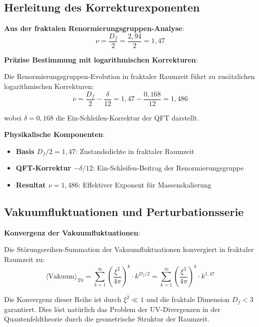 \documentclass[12pt,a4paper]{article}
\newcommand{\nulep}{\nu}
\begin{document}
\subsection{Herleitung des Korrekturexponenten}

\textbf{Aus der fraktalen Renormierungsgruppen-Analyse}:
\begin{equation}
	\nulep = \frac{D_f}{2} = \frac{2{,}94}{2} = 1{,}47
\end{equation}

\textbf{Präzise Bestimmung mit logarithmischen Korrekturen}:

Die Renormierungsgruppen-Evolution in fraktaler Raumzeit führt zu zusätzlichen logarithmischen Korrekturen:
\begin{equation}
	\nulep = \frac{D_f}{2} - \frac{\delta}{12} = 1{,}47 - \frac{0{,}168}{12} = 1{,}486
\end{equation}

wobei $\delta = 0{,}168$ die Ein-Schleifen-Korrektur der QFT darstellt.

\textbf{Physikalische Komponenten}:
\begin{itemize}
	\item \textbf{Basis $D_f/2 = 1{,}47$}: Zustandsdichte in fraktaler Raumzeit
	\item \textbf{QFT-Korrektur $-\delta/12$}: Ein-Schleifen-Beitrag der Renormierungsgruppe
	\item \textbf{Resultat $\nulep = 1{,}486$}: Effektiver Exponent für Massenskalierung
\end{itemize}

\subsection{Vakuumfluktuationen und Perturbationsserie}

\textbf{Konvergenz der Vakuumfluktuationen}:

Die Störungsreihen-Summation der Vakuumfluktuationen konvergiert in fraktaler Raumzeit zu:
\begin{equation}
	\langle \text{Vakuum} \rangle_{\text{T0}} = \sum_{k=1}^{\infty} \left(\frac{\xi^2}{4\pi}\right)^k \cdot k^{D_f/2} = \sum_{k=1}^{\infty} \left(\frac{\xi^2}{4\pi}\right)^k \cdot k^{1{,}47}
\end{equation}

Die Konvergenz dieser Reihe ist durch $\xi^2 \ll 1$ und die fraktale Dimension $D_f < 3$ garantiert. Dies löst natürlich das Problem der UV-Divergenzen in der Quantenfeldtheorie durch die geometrische Struktur der Raumzeit.
\end{document}
